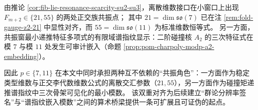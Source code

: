 \begin{remark}\label{rem:fib-lie-primes-7-11-double-alignment}
由推论 \ref{cor:fib-lie-resonance-scarcity-su2-su3}，离散维数接口在小窗口上出现 \(F_{m+2}\in\{21,55\}\) 的两处正交族共振点；
其中 \(21=\dim\mathfrak{so}(7)\) 已在注 \ref{rem:fold-gauge-z2-21} 中显性对齐，而 \(55=\dim\mathfrak{so}(11)\) 为标准维数恒等式。
另一方面，共振窗最小递推特征多项式的有限域谱指纹显示：二阶碰撞核 \(A_2\) 的三次特征式在模 \(7\) 与模 \(11\) 处发生可审计嵌入（命题 \ref{prop:pom-charpoly-modp-a2-embedding}）。
\par
因此 \(p\in\{7,11\}\) 在本文中同时承担两种互不依赖的“共振角色”：一方面作为稳定类型维数与正交李代数维数公式的离散交汇参数（\(21,55\)），另一方面作为碰撞矩递推谱指纹中三次骨架可见化的最小模数。
该双重对齐为后续建立“群论分辨率签名”与“谱指纹嵌入模数”之间的算术桥梁提供一条可扩展且可证伪的起点。
\end{remark}

